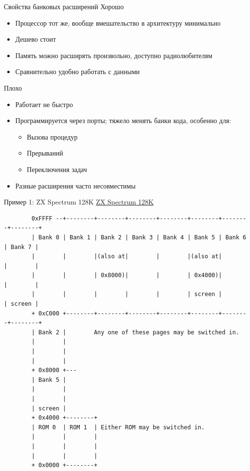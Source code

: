 \documentclass[xetex,aspectratio=43]{beamer}
\begin{document}
\begin{frame}{Свойства банковых расширений}
        Хорошо

        \begin{itemize}
            \tightlist
            \item
            Процессор тот же, вообще вмешательство в архитектуру минимально
            \item
            Дешево стоит
            \item
            Память можно расширять произвольно, доступно радиолюбителям
            \item
            Сравнительно удобно работать с данными
        \end{itemize}

        Плохо

        \begin{itemize}
            \tightlist
            \item
            Работает не быстро
            \item
            Программируется через порты; тяжело менять банки кода, особенно для:

            \begin{itemize}
                \tightlist
                \item
                Вызова процедур
                \item
                Прерываний
                \item
                Переключения задач
            \end{itemize}
            \item
            Разные расширения часто несовместимы
        \end{itemize}
\end{frame}

\begin{frame}[fragile]{Пример 1: ZX Spectrum 128K}
    \href{http://www.worldofspectrum.org/faq/reference/128kreference.htm}{ZX
        Spectrum 128K}

    { \scriptsize \begin{verbatim}
        0xFFFF --+--------+--------+--------+--------+--------+--------+--------+
        | Bank 0 | Bank 1 | Bank 2 | Bank 3 | Bank 4 | Bank 5 | Bank 6 | Bank 7 |
        |        |        |(also at|        |        |(also at|        |        |
        |        |        | 0x8000)|        |        | 0x4000)|        |        |
        |        |        |        |        |        | screen |        | screen |
        + 0xC000 +--------+--------+--------+--------+--------+--------+--------+
        | Bank 2 |        Any one of these pages may be switched in.
        |        |
        |        |
        |        |
        + 0x8000 +---
        | Bank 5 |
        |        |
        |        |
        | screen |
        + 0x4000 +--------+
        | ROM 0  | ROM 1  | Either ROM may be switched in.
        |        |        |
        |        |        |
        |        |        |
        + 0x0000 +--------+
    \end{verbatim} }
\end{frame}
\end{document}
